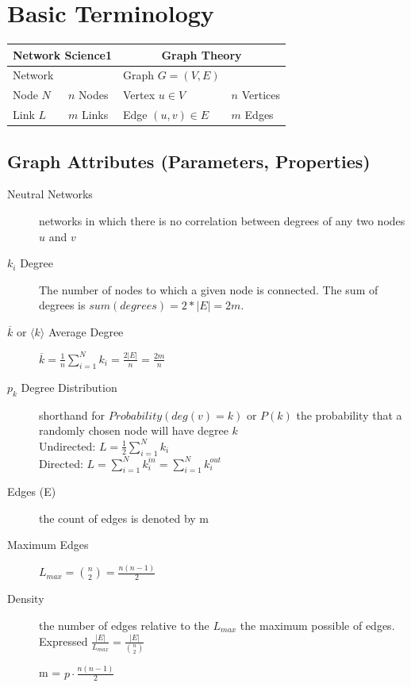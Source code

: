 \documentclass[../main.tex]{subfiles}
\begin{document}
\section{Basic Terminology}
\begin{table}
\centering

\begin{tabular}{|l|l|l|l|}
\hline
\multicolumn{2}{|c|}{\textbf{Network Science1}}& \multicolumn{2}{|c|}{\textbf{Graph Theory}}\\
\hline

\hline
Network  && Graph $G = (V, E)$ &\\
\hline
Node $N$ &$n$ Nodes& Vertex $u \in V$ &$n$ Vertices\\
\hline
Link $L$ &$m$ Links& Edge $(u, v) \in E$  &$m$ Edges\\
\hline

\end{tabular}

\end{table}




\subsection{Graph Attributes (Parameters, Properties)}
\begin{description}
    \item [Neutral Networks] networks in which there is no correlation between degrees of any two nodes $u$ and $v$
    \item[$k_i$ Degree] The number of nodes to which a given node is connected. The sum of degrees is $sum(degrees)=2*|E|=2m$.
    \item[$\overline{k} $ or $\langle k\rangle$ Average Degree]  $\overline{k}= \frac{1}{n}\sum\limits_{i = 1}^N {k_i } =\frac{2|E|}{n}=\frac{2m}{n}$
    \item[$p_k$ Degree Distribution] shorthand for $Probability (deg(v) = k)$ or $P(k)$ the probability that a randomly chosen node will have degree $k$ \\
    Undirected:             $L = \frac{1}{2}\sum\limits_{i = 1}^N {k_i }$ \\
    Directed: $L = \sum\limits_{i = 1}^N {k_i^{in} }  = \sum\limits_{i = 1}^N {k_i^{out} }$
    \item [Edges (E)]the count of edges is denoted by m
    \item[Maximum Edges]  $L_{max}={\binom{n}{2}}=\frac{n(n-1)}{2}$
    \item [Density] the number of edges relative to the $L_{max}$ the maximum possible of edges. Expressed $\frac{|E|}{L_{max}} =  \frac{|E|}{\binom{n}{2}}$

m = $p\cdot\frac{n(n-1)}{2}$
\end{description}
\end{document}
